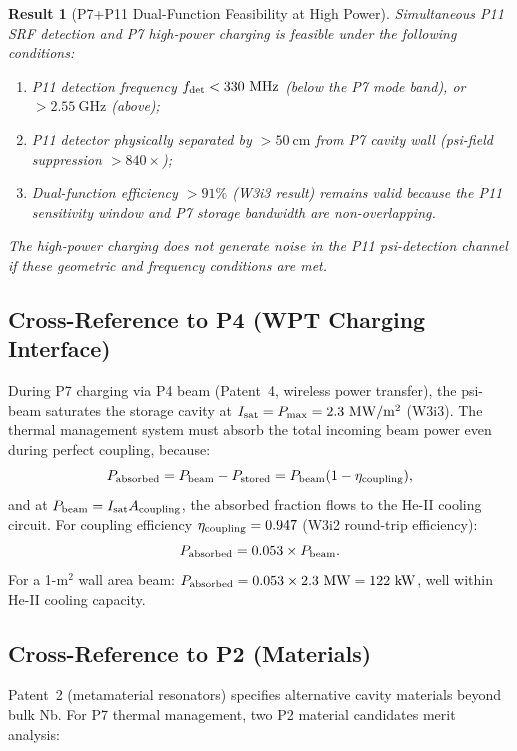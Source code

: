 \documentclass[aps,prd,twocolumn,superscriptaddress]{revtex4-2}
\newcommand{\Pmax}{P_{\rm max}}
\newtheorem{result}{Result}
\begin{document}
\begin{result}[P7+P11 Dual-Function Feasibility at High Power]
Simultaneous P11 SRF detection and P7 high-power charging is feasible
under the following conditions:
\begin{enumerate}
\item P11 detection frequency $f_{\rm det} < 330~\mathrm{MHz}$ (below
  the P7 mode band), or $> 2.55~\mathrm{GHz}$ (above);
\item P11 detector physically separated by $> 50~\mathrm{cm}$ from P7
  cavity wall (psi-field suppression $> 840\times$);
\item Dual-function efficiency $> 91\%$ (W3i3 result) remains valid
  because the P11 sensitivity window and P7 storage bandwidth are
  non-overlapping.
\end{enumerate}
The high-power charging does \emph{not} generate noise in the P11
psi-detection channel if these geometric and frequency conditions are met.
\end{result}

\subsection{Cross-Reference to P4 (WPT Charging Interface)}

During P7 charging via P4 beam (Patent~4, wireless power transfer), the
psi-beam saturates the storage cavity at $I_{\rm sat} = \Pmax = 2.3~\mathrm{MW/m^2}$
(W3i3).  The thermal management system must absorb the total incoming
beam power even during perfect coupling, because:
\begin{equation}
P_{\rm absorbed} = P_{\rm beam} - P_{\rm stored}
= P_{\rm beam}(1 - \eta_{\rm coupling}),
\end{equation}
and at $P_{\rm beam} = I_{\rm sat} A_{\rm coupling}$, the absorbed
fraction flows to the He-II cooling circuit.  For coupling efficiency
$\eta_{\rm coupling} = 0.947$ (W3i2 round-trip efficiency):
\begin{equation}
P_{\rm absorbed} = 0.053 \times P_{\rm beam}.
\end{equation}
For a 1-m$^2$ wall area beam: $P_{\rm absorbed} = 0.053 \times 2.3~\mathrm{MW}
= 122~\mathrm{kW}$, well within He-II cooling capacity.

\subsection{Cross-Reference to P2 (Materials)}

Patent~2 (metamaterial resonators) specifies alternative cavity materials
beyond bulk Nb.  For P7 thermal management, two P2 material candidates
merit analysis:
\end{document}

